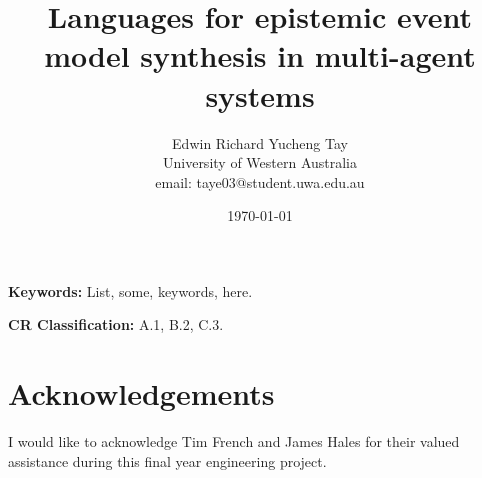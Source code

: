 \documentclass[12pt,a4paper]{article}
\title{Languages for epistemic event model synthesis in multi-agent systems}
\author{Edwin Richard Yucheng Tay \\
University of Western Australia \\
email: taye03@student.uwa.edu.au }
\date{\today}
\begin{document}
\maketitle

\begin{abstract}


\end{abstract}

{\bf Keywords:} List, some, keywords, here.

{\bf CR Classification:} A.1, B.2, C.3.

\pagebreak

\tableofcontents







\section*{Acknowledgements}

I would like to acknowledge Tim French and James Hales for their valued assistance during this final
year engineering project.




\end{document}
